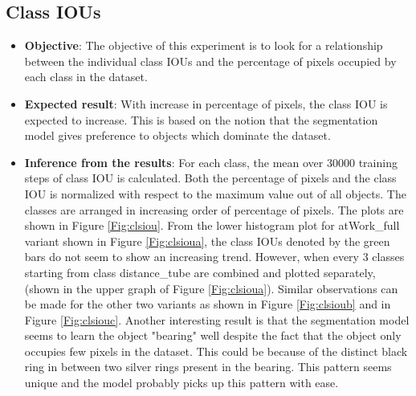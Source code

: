 	\subsection{Class IOUs}	
		\begin{itemize}
			\item \textbf{Objective}: The objective of this experiment is to look for a relationship between the individual class IOUs and the percentage of pixels occupied by each class in the dataset. 
			\item \textbf{Expected result}: With increase in percentage of pixels, the class IOU is expected to increase. This is based on the notion that the segmentation model gives preference to objects which dominate the dataset. 
			\item \textbf{Inference from the results}: For each class, the mean over 30000 training steps of class IOU is calculated. Both the percentage of pixels and the class IOU is normalized with respect to the maximum value out of all objects. The classes are arranged in increasing order of percentage of pixels. The plots are shown in Figure \ref{Fig:clsiou}. From the lower histogram plot for atWork\_full variant shown in Figure \ref{Fig:clsioua}, the class IOUs denoted by the green bars do not seem to show an increasing trend. However, when every 3 classes starting from class distance\_tube are combined and plotted separately, (shown in the upper graph of Figure \ref{Fig:clsioua}). Similar observations can be made for the other two variants as shown in Figure \ref{Fig:clsioub} and in Figure \ref{Fig:clsiouc}. 
			Another interesting result is that the segmentation model seems to learn the object "bearing" well despite the fact that the object only occupies few pixels in the dataset. This could be because of the distinct black ring in between two silver rings present in the bearing. This pattern seems unique and the model probably picks up this pattern with ease.
		\end{itemize}
	
